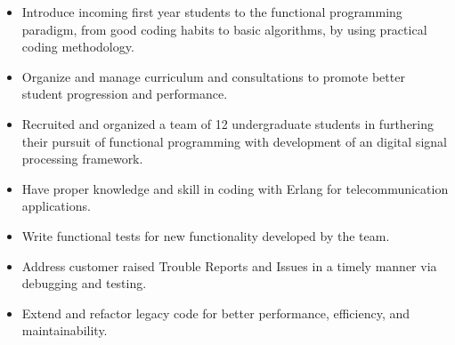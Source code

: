 \documentclass[10pt,a4paper]{altacv}
\begin{document}

\begin{fullwidth}
\makecvheader
\end{fullwidth}




\begin{itemize}
\item Introduce incoming first year students to the functional programming paradigm, from good coding habits to basic algorithms, by using practical coding methodology.
\item Organize and manage curriculum and consultations to promote better student progression and performance.
\item Recruited and organized a team of 12 undergraduate students in furthering their pursuit of functional programming with development of an digital signal processing framework.  
\end{itemize}

\divider

\begin{itemize}
\item Have proper knowledge and skill in coding with Erlang for telecommunication applications.

\item Write functional tests for new functionality developed by the team.

\item Address customer raised Trouble Reports and Issues in a timely manner via debugging and testing.

\item Extend and refactor legacy code for better performance, efficiency, and maintainability.

\end{itemize}
\end{document}
